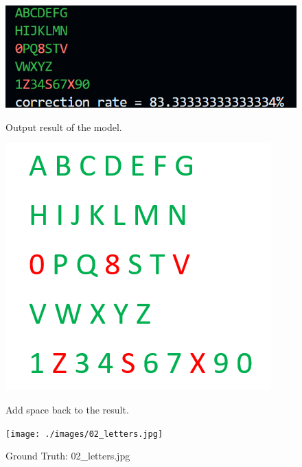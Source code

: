 \documentclass{article}
\begin{document}
\begin{figure}[H]
	\centering
	\begin{minipage}{0.33\linewidth}
		\centering
		\includegraphics[width=\linewidth]{./Q44_res2.png}
		\caption{Output result of the model.}
		\label{fig:Q44_res2}
	\end{minipage}%
	\hfill
	\begin{minipage}{0.33\linewidth}
		\centering
		\includegraphics[width=0.6\linewidth, height=0.35\columnwidth]{./Q44_add_space2.png}
		\caption{Add space back to the result.}
		\label{fig:Q44_add_space2}
	\end{minipage}%
	\hfill
	\begin{minipage}{0.33\linewidth}
		\centering
		\texttt{[image: ./images/02\_letters.jpg]}
		\caption{Ground Truth: 02\_letters.jpg}
		\label{fig:Q44_res2_gt}
	\end{minipage}
\end{figure}
\end{document}
